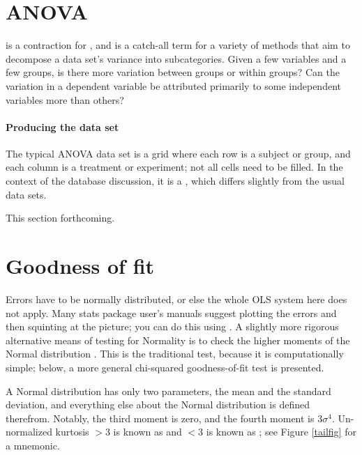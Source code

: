 \section{ANOVA}  is a contraction for , and is a catch-all term for a variety of methods that
aim to decompose a data set's variance into subcategories. Given a few
variables and a few groups, is there more variation between groups or
within groups? Can the variation in a dependent variable be attributed
primarily to some independent variables more than others?

\paragraph{Producing the data set} The typical ANOVA data set is a grid
where each row is a subject or group, and each column is a treatment or
experiment; not all cells need to be filled. In the context of the
database discussion, it is a , which differs slightly
from the usual data sets.

This section forthcoming.

\section{Goodness of fit}

Errors have to be normally distributed, or else
the whole OLS system here does not apply. Many stats package user's manuals
suggest plotting the errors and then squinting at the picture; you can
do this using . 
A slightly more rigorous alternative means of testing for Normality
is to check the higher moments of the Normal distribution
\citep{bowman:shenton}.  This is the
traditional test, because it is computationally simple; below, a more
general chi-squared goodness-of-fit test is presented.

A Normal distribution has only two parameters, the mean and the
standard deviation, and everything else about the Normal distribution is
defined therefrom. Notably, the third moment is zero, and the fourth
moment is $3 \sigma^4$. 
Un-normalized kurtosis $>3$ is known as  and $<3$ is
known as ; see Figure \ref{tailfig} for a mnemonic.


